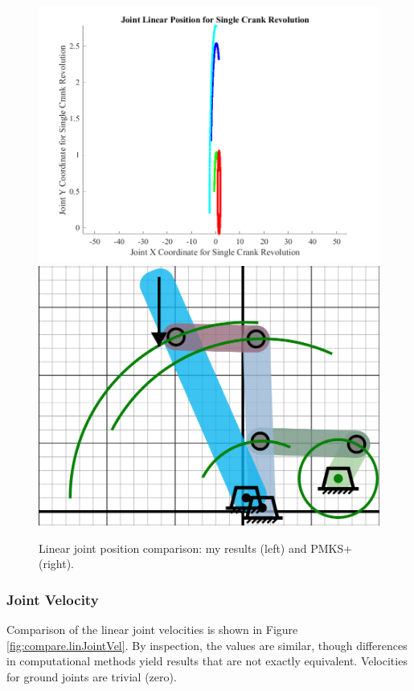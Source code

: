 \documentclass[12pt]{article}
\begin{document}
\begin{figure}[ht]
  \centering
  \includegraphics[scale=0.5]{../matlab-plots/linJointPos.png}%
  \includegraphics[scale=0.25]{../pmks-plots/linJointPos.png}
  \caption{\label{fig:compare.linJointPos}Linear joint position comparison: my results (left) and PMKS+ (right).}
\end{figure}

\subsubsection{Joint Velocity}%
\label{res.compare.linJointVel}

Comparison of the linear joint velocities is shown in Figure \ref{fig:compare.linJointVel}. By inspection, the values are similar, though differences in computational methods yield results that are not exactly equivalent. Velocities for ground joints are trivial (zero).
\end{document}
